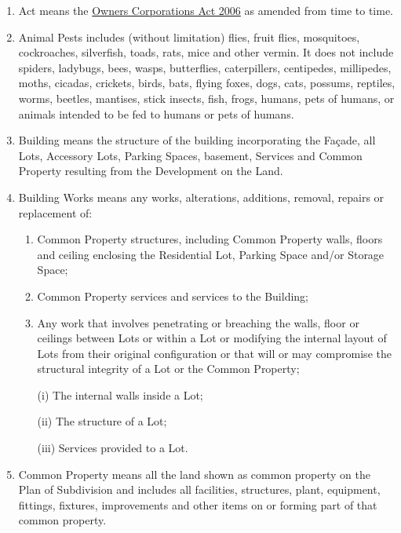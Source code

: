 \documentclass{article}
\begin{document}
\begin{enumerate}[label=\arabic*.]
\begin{enumerate}[label=\arabic{enumi}.\arabic*.]
\begin{enumerate}[label=(\arabic*)]
\item  Act means the \href{https://www.legislation.vic.gov.au/in-force/acts/owners-corporations-act-2006/017}{Owners Corporations Act 2006} as amended from time to time.
\item Animal Pests includes (without limitation) flies, fruit flies, mosquitoes, cockroaches, silverfish, toads, rats, mice and other vermin. It does not include spiders, ladybugs, bees, wasps, butterflies, caterpillers, centipedes, millipedes, moths, cicadas, crickets, birds, bats, flying foxes, dogs, cats, possums, reptiles, worms, beetles, mantises, stick insects, fish, frogs, humans, pets of humans, or animals intended to be fed to humans or pets of humans.

\item  Building means the structure of the building incorporating the Façade, all Lots, Accessory Lots, Parking Spaces, basement, Services and Common Property resulting from the Development on the Land.

\item  Building Works means any works, alterations, additions, removal, repairs or replacement of:

\begin{enumerate}[label=(\alph*)]

\item  Common Property structures, including Common Property walls, floors and ceiling enclosing the Residential Lot, Parking Space and/or Storage Space;

\item  Common Property services and services to the Building;

\item  Any work that involves penetrating or breaching the walls, floor or ceilings between Lots or within a Lot or modifying the internal layout of Lots from their original configuration or that will or may compromise the structural integrity of a Lot or the Common Property;

(i) The internal walls inside a Lot;
\newpage



(ii) The structure of a Lot;

(iii) Services provided to a Lot.

\end{enumerate}

\item  Common Property means all the land shown as common property on the Plan of Subdivision and includes all facilities, structures, plant, equipment, fittings, fixtures, improvements and other items on or forming part of that common property.


\end{enumerate}
\end{enumerate}
\end{enumerate}
\end{document}
